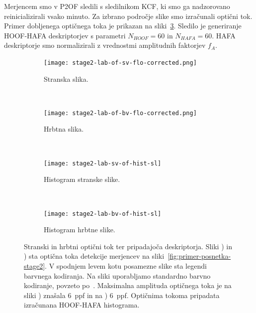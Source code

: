 Merjencem smo v P2OF sledili s sledilnikom KCF, ki smo ga nadzorovano reinicializirali vsako minuto. Za izbrano področje slike smo izračunali optični tok. Primer dobljenega optičnega toka je prikazan na sliki~\ref{fig:opticni-tok-stage2}. Sledilo je generiranje HOOF-HAFA deskriptorjev s parametri $N_{HOOF} = 60$ in $N_{HAFA} = 60$. HAFA deskriptorje smo normalizirali z vrednostmi amplitudnih faktorjev $f_A$. %



\begin{figure}[!htb]
	\centering
	\begin{subfigure}[t]{0.45\columnwidth}
		\centering
		\texttt{[image: stage2-lab-of-sv-flo-corrected.png]}
		\caption{Stranska slika.}
		\label{fig:stage2-lab-of-sv-flo}
	\end{subfigure}
	~
	\begin{subfigure}[t]{0.45\columnwidth}
		\centering
		\texttt{[image: stage2-lab-of-bv-flo-corrected.png]}
		\caption{Hrbtna slika.}
		\label{fig:stage2-lab-of-bv-flo}
	\end{subfigure}
	~
	\begin{subfigure}[t]{0.45\columnwidth}
		\texttt{[image: stage2-lab-sv-of-hist-sl]}
		\caption{Histogram stranske slike.}
	\end{subfigure}
	~
	\begin{subfigure}[t]{0.45\columnwidth}
		\texttt{[image: stage2-lab-bv-of-hist-sl]}
		\caption{Histogram hrbtne slike.}
	\end{subfigure}
    \caption[Stranski in hrbtni optični tok ter pripadajoča deskriptorja]{Stranski in hrbtni optični tok ter pripadajoča deskriptorja. Sliki ) in ) sta optična toka detekcije merjencev na sliki~\ref{fig:primer-posnetka-stage2}. V spodnjem levem kotu posamezne slike sta legendi barvnega kodiranja. Na sliki uporabljamo standardno barvno kodiranje, povzeto po~\cite{baker2011database}. Maksimalna amplituda optičnega toka je na sliki  ) znašala \SI{6}{ppf} in na ) \SI{6}{ppf}. Optičnima tokoma pripadata izračunana HOOF-HAFA histograma.}
	\label{fig:opticni-tok-stage2}
\end{figure}


